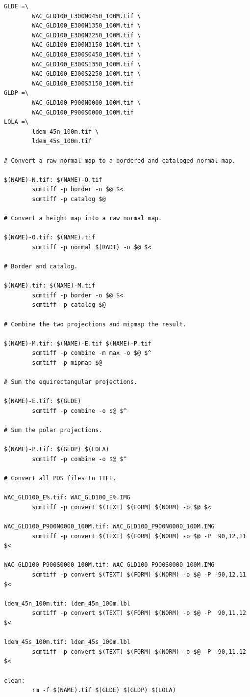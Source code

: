 \documentclass[oneside,10pt]{memoir}
\begin{document}
\begin{Spacing}{1.1}
\begin{Verbatim}
GLDE =\
        WAC_GLD100_E300N0450_100M.tif \
        WAC_GLD100_E300N1350_100M.tif \
        WAC_GLD100_E300N2250_100M.tif \
        WAC_GLD100_E300N3150_100M.tif \
        WAC_GLD100_E300S0450_100M.tif \
        WAC_GLD100_E300S1350_100M.tif \
        WAC_GLD100_E300S2250_100M.tif \
        WAC_GLD100_E300S3150_100M.tif
GLDP =\
        WAC_GLD100_P900N0000_100M.tif \
        WAC_GLD100_P900S0000_100M.tif
LOLA =\
        ldem_45n_100m.tif \
        ldem_45s_100m.tif

# Convert a raw normal map to a bordered and cataloged normal map.

$(NAME)-N.tif: $(NAME)-O.tif
        scmtiff -p border -o $@ $<
        scmtiff -p catalog $@

# Convert a height map into a raw normal map.

$(NAME)-O.tif: $(NAME).tif
        scmtiff -p normal $(RADI) -o $@ $<

# Border and catalog.

$(NAME).tif: $(NAME)-M.tif
        scmtiff -p border -o $@ $<
        scmtiff -p catalog $@

# Combine the two projections and mipmap the result.

$(NAME)-M.tif: $(NAME)-E.tif $(NAME)-P.tif
        scmtiff -p combine -m max -o $@ $^
        scmtiff -p mipmap $@

# Sum the equirectangular projections.

$(NAME)-E.tif: $(GLDE)
        scmtiff -p combine -o $@ $^

# Sum the polar projections.

$(NAME)-P.tif: $(GLDP) $(LOLA)
        scmtiff -p combine -o $@ $^

# Convert all PDS files to TIFF.

WAC_GLD100_E%.tif: WAC_GLD100_E%.IMG
        scmtiff -p convert $(TEXT) $(FORM) $(NORM) -o $@ $<

WAC_GLD100_P900N0000_100M.tif: WAC_GLD100_P900N0000_100M.IMG
        scmtiff -p convert $(TEXT) $(FORM) $(NORM) -o $@ -P  90,12,11 $<

WAC_GLD100_P900S0000_100M.tif: WAC_GLD100_P900S0000_100M.IMG
        scmtiff -p convert $(TEXT) $(FORM) $(NORM) -o $@ -P -90,12,11 $<

ldem_45n_100m.tif: ldem_45n_100m.lbl
        scmtiff -p convert $(TEXT) $(FORM) $(NORM) -o $@ -P  90,11,12 $<

ldem_45s_100m.tif: ldem_45s_100m.lbl
        scmtiff -p convert $(TEXT) $(FORM) $(NORM) -o $@ -P -90,11,12 $<

clean:
        rm -f $(NAME).tif $(GLDE) $(GLDP) $(LOLA)
\end{Verbatim}

\printpagenotes
\end{Spacing}
\end{document}
